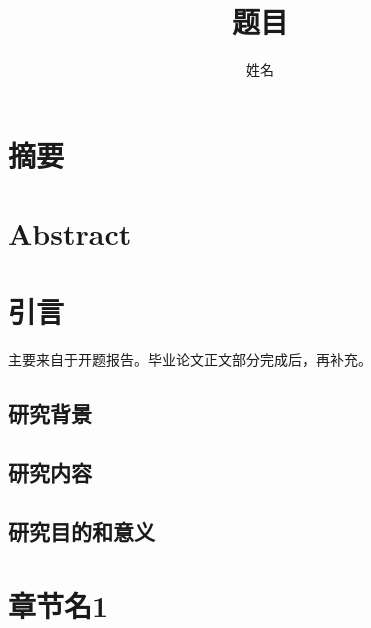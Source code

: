 \documentclass[cs4size]{ctexbook}
\numberwithin{equation}{section}
\begin{document}
	
	
	\title{题目}
	\author{姓名}
	\date{}
	\maketitle
	
	\chapter*{摘要}
	\thispagestyle{fancy} %
	
	\zhlipsum[1]
	
	\chapter*{Abstract}
	\thispagestyle{fancy} %
	
	\lipsum[1]
	
	\tableofcontents  %
	\thispagestyle{fancy} %
	
	\chapter{引言}
	\thispagestyle{fancy} %
	
	主要来自于开题报告。毕业论文正文部分完成后，再补充。
	
	
	\section{研究背景}\indent

	\zhlipsum[1-3]
	
	\section{研究内容}\indent
	
	\zhlipsum[1-3]
	
	\section{研究目的和意义}\indent
	
	\zhlipsum[1-3]
	
	\chapter{章节名1}
	\thispagestyle{fancy} %
	
\end{document}
